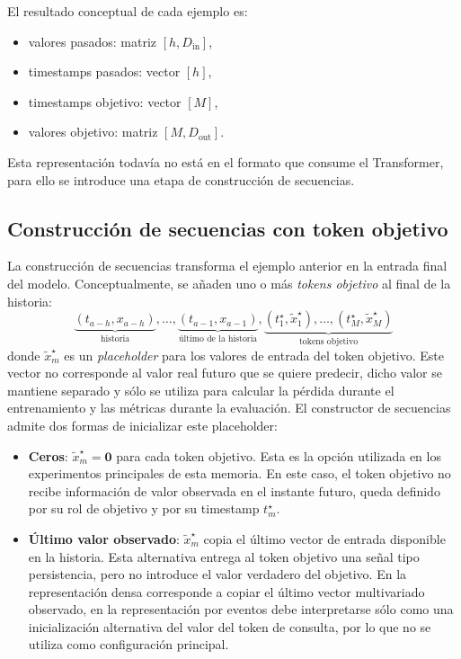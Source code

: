 El resultado conceptual de cada ejemplo es:
\begin{itemize}
    \item valores pasados: matriz $[h, D_{\text{in}}]$,
    \item timestamps pasados: vector $[h]$,
    \item timestamps objetivo: vector $[M]$,
    \item valores objetivo: matriz $[M, D_{\text{out}}]$.
\end{itemize}

Esta representación todavía no está en el formato que consume el Transformer, para ello se introduce una etapa de construcción de secuencias.

\subsection{Construcción de secuencias con token objetivo}
\label{sec:sequence-builder-detalle}

La construcción de secuencias transforma el ejemplo anterior en la entrada final del modelo. Conceptualmente, se añaden uno o más \emph{tokens objetivo} al final de la historia:
\[
    \underbrace{(t_{a-h}, x_{a-h})}_{\text{historia}}, \dots,
    \underbrace{(t_{a-1}, x_{a-1})}_{\text{último de la historia}},
    \underbrace{(t^\star_1, \tilde{x}^\star_1), \dots, (t^\star_M, \tilde{x}^\star_M)}_{\text{tokens objetivo}}
\]
donde $\tilde{x}^\star_m$ es un \emph{placeholder} para los valores de entrada del token objetivo. Este vector no corresponde al valor real futuro que se quiere predecir, dicho valor se mantiene separado y sólo se utiliza para calcular la pérdida durante el entrenamiento y las métricas durante la evaluación. El constructor de secuencias admite dos formas de inicializar este placeholder:
\begin{itemize}
    \item \textbf{Ceros}: $\tilde{x}^\star_m = \mathbf{0}$ para cada token objetivo. Esta es la opción utilizada en los experimentos principales de esta memoria. En este caso, el token objetivo no recibe información de valor observada en el instante futuro, queda definido por su rol de objetivo y por su timestamp $t^\star_m$.
    \item \textbf{Último valor observado}: $\tilde{x}^\star_m$ copia el último vector de entrada disponible en la historia. Esta alternativa entrega al token objetivo una señal tipo persistencia, pero no introduce el valor verdadero del objetivo. En la representación densa corresponde a copiar el último vector multivariado observado, en la representación por eventos debe interpretarse sólo como una inicialización alternativa del valor del token de consulta, por lo que no se utiliza como configuración principal.
\end{itemize}

